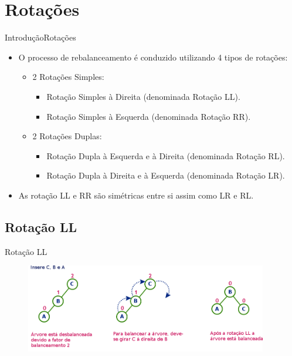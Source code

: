 \documentclass[aspectratio=169]{beamer}
\begin{document}
\section{Rotações}

\begin{frame}{Introdução}{Rotações}
\begin{itemize}
 \item O processo de rebalanceamento é conduzido utilizando 4 tipos de rotações: 
 \begin{itemize}
 \item 2 Rotações Simples:
 \begin{itemize}
 \item Rotação Simples à Direita (denominada Rotação LL).
 \item Rotação Simples à Esquerda (denominada Rotação RR). 
 \end{itemize}
 \item 2 Rotações Duplas:
 \begin{itemize}
 \item Rotação Dupla à Esquerda e à Direita (denominada Rotação RL).
 \item Rotação Dupla à Direita e à Esquerda (denominada Rotação LR).
 \end{itemize} 
 \end{itemize}
  \item As rotação LL e RR são simétricas entre si assim como LR e RL.
\end{itemize}
\end{frame}

\subsection{Rotação LL}

\begin{frame}{Rotação LL}
\begin{figure}[!h]
  \centering
   \includegraphics[width=300pt]{imagens/rotacao_ll.png}
  \label{fig_rotacao_ll}
\end{figure}
\end{frame}
\end{document}
